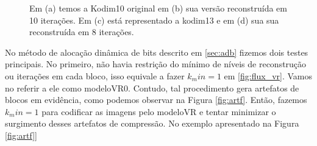 \begin{figure}
	
	\hfill
	
	\hfill
	\caption{Em (a) temos a Kodim10 original em (b) sua versão reconstruída em 10 iterações. Em (c) está representado a kodim13 e em (d) sua sua reconstruída em 8 iterações.}
	\label{fig:kodim13}
\end{figure}
No método de alocação dinâmica de bits descrito em \ref{sec:adb} fizemos dois testes principais. No primeiro, não havia restrição do mínimo de níveis de reconstrução ou iterações em cada bloco, isso equivale a fazer $k_min=1$ em \ref{fig:flux_vr}. Vamos no referir a ele como modeloVR0. Contudo, tal procedimento gera artefatos de blocos em evidência, como podemos observar na Figura \ref{fig:artf}. Então, fazemos $k_min=1$ para codificar as imagens pelo modeloVR e tentar minimizar o surgimento desses artefatos de compressão.   
No exemplo apresentado na Figura \ref{fig:artf]}

